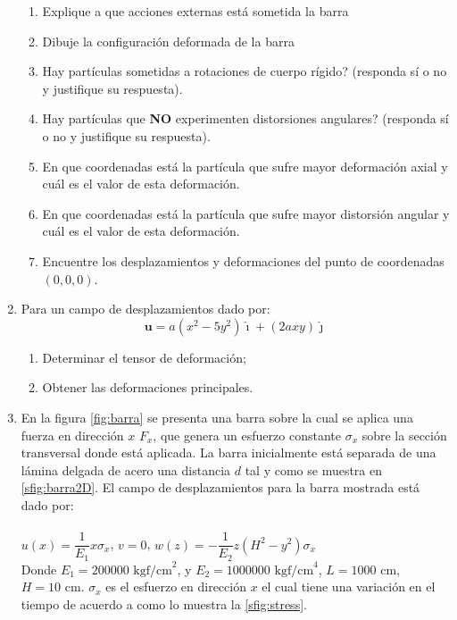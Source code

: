 \documentclass[../notas medios.tex]{subfiles}
\begin{document}
\begin{enumerate}
\begin{enumerate}
%
	\item Explique a que acciones externas está sometida la barra
	\item Dibuje la configuración deformada de la barra
	\item \textquestiondown Hay partículas sometidas a rotaciones de cuerpo 
	rígido? (responda sí o no y justifique su respuesta).
	\item \textquestiondown Hay partículas que {\textbf{NO}} experimenten 
	distorsiones angulares? (responda sí o no y justifique su respuesta).
	\item En que coordenadas está la partícula que sufre mayor deformación 
	axial y cuál es el valor de esta deformación.
	\item En que coordenadas está la partícula que sufre mayor distorsión 
	angular y cuál es el valor de esta deformación.
	\item Encuentre los desplazamientos y deformaciones del punto de 
	coordenadas $(0,0,0)$.
%
\end{enumerate}
%
\item   \label{punto11_d} Para un campo de desplazamientos dado por:
\[\mathbf{u} = a(x^2 - 5y^2)\hat{\imath} + (2ax y)\hat{\jmath} \]

\begin{enumerate}
\item Determinar el tensor de deformaci\'on;
\item Obtener las deformaciones principales.
\end{enumerate}

\item \label{punto12_d} En la figura \cref{fig:barra} se presenta una barra 
sobre la cual se aplica una fuerza en dirección $x$ $F_{x}$, que genera  un 
esfuerzo constante $\sigma_x$ sobre la sección transversal donde está aplicada. 
La barra inicialmente está  separada de una lámina delgada de acero una 
distancia $d$ tal y como se muestra en \cref{sfig:barra2D}. El campo de 
desplazamientos para la barra mostrada está dado por:\\\\
%
 $u\left( x \right) = \dfrac{1}{E_1}  x \sigma_x$, \hspace*{10mm} $v=0$, \hspace*{10mm} $w\left( z \right) = - \dfrac{1}{E_2}  z (H^2 - y^2) \sigma_x$ \\

Donde $E_1 = 200000 \text{ kgf/cm}^2$,   y $E_2 = 1000000 \text{ kgf/cm}^4$, $L 
= 1000 \text{ cm}$, $H = 10 \text{ cm}$. $\sigma_x$ es el esfuerzo en dirección 
$x$ el cual tiene una variación en el tiempo de acuerdo a como lo muestra la  
\cref{sfig:stress}.  


\end{enumerate}
\end{document}
